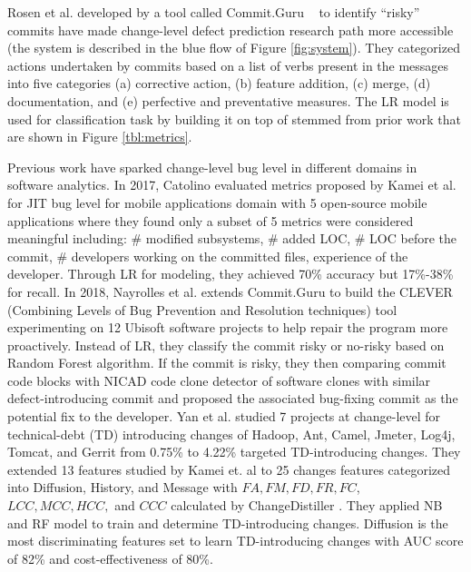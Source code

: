 \documentclass[10pt,conference]{IEEEtran}
\begin{document}
Rosen et al. developed by a tool called Commit.Guru ~\cite{commitguru} to identify ``risky'' commits have made change-level defect prediction research path more accessible (the system is described in the blue flow of Figure \ref{fig:system}). They categorized actions undertaken by commits based on a list of verbs present in the messages into five categories (a) corrective action, (b) feature addition, (c) merge, (d) documentation, and (e) perfective and preventative measures. The LR model is used for classification task by building it on top of  stemmed from prior work  that are shown in Figure \ref{tbl:metrics}. 
 
Previous work have sparked change-level bug level in different domains in software analytics. In 2017, Catolino \cite{catolino17_jitmobile} evaluated metrics proposed by Kamei et al. \cite{kamei12_jit} for JIT bug level for mobile applications domain with 5 open-source mobile applications where they found only a subset of 5 metrics were considered meaningful including: \# modified subsystems, \# added LOC, \# LOC before the commit, \# developers working on the committed files, experience of the developer. Through LR for modeling, they achieved 70\% accuracy but 17\%-38\% for recall. In 2018, Nayrolles et al. \cite{nayrolles18_clever} extends Commit.Guru to build the CLEVER (Combining Levels of Bug Prevention and Resolution techniques) tool experimenting on 12 Ubisoft software projects to help repair the program more proactively. Instead of LR, they classify the commit risky or no-risky based on Random Forest algorithm. If the commit is risky, they then comparing commit code blocks with NICAD code clone detector \cite{cordy11_NiCad} of software clones with similar defect-introducing commit and proposed the associated bug-fixing commit as the potential fix to the developer. Yan et al. \cite{yan18_tddetermination} studied 7 projects at change-level for technical-debt (TD) introducing changes of Hadoop, Ant, Camel, Jmeter, Log4j, Tomcat, and Gerrit from 0.75\% to 4.22\% targeted TD-introducing changes. They extended 13 features studied by Kamei et. al \cite{kamei12_jit} to 25 changes features categorized into Diffusion, History, and Message with $FA, FM, FD, FR, FC$, $LCC, MCC, HCC,$ and $CCC$ calculated by ChangeDistiller \cite{fluri07_changedistiller}. They applied NB and RF model to train and determine TD-introducing changes. Diffusion is the most discriminating features set to learn TD-introducing changes with AUC score of 82\% and cost-effectiveness of 80\%.
\end{document}
